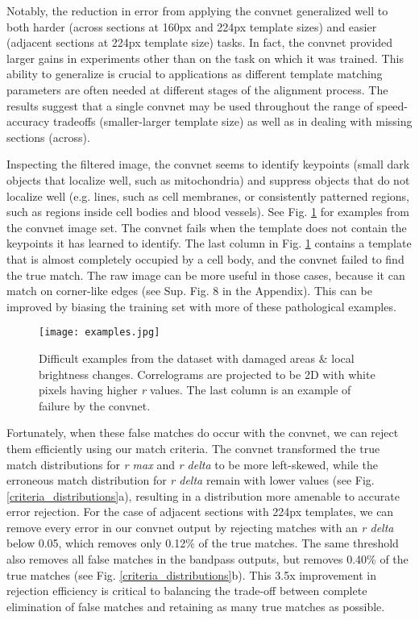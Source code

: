 \documentclass{article}
\begin{document}
Notably, the reduction in error from applying the convnet generalized well to both harder (across sections at 160px and 224px template sizes) and easier (adjacent sections at 224px template size) tasks. In fact, the convnet provided larger gains in experiments other than on the task on which it was trained. This ability to generalize is crucial to applications as different template matching parameters are often needed at different stages of the alignment process. The results suggest that a single convnet may be used throughout the range of speed-accuracy tradeoffs (smaller-larger template size) as well as in dealing with missing sections (across).

Inspecting the filtered image, the convnet seems to identify keypoints (small dark objects that localize well, such as mitochondria) and suppress objects that do not localize well (e.g. lines, such as cell membranes, or consistently patterned regions, such as regions inside cell bodies and blood vessels). See Fig. \ref{ncc_examples2} for examples from the convnet image set. The convnet fails when the template does not contain the keypoints it has learned to identify. The last column in Fig. \ref{ncc_examples2} contains a template that is almost completely occupied by a cell body, and the convnet failed to find the true match. The raw image can be more useful in those cases, because it can match on corner-like edges (see Sup. Fig. 8 in the Appendix). This can be improved by biasing the training set with more of these pathological examples.

\begin{figure}[h]
  \centering
  
  \texttt{[image: examples.jpg]}
  \caption{Difficult examples from the dataset with damaged areas \& local brightness changes. Correlograms are projected to be 2D with white pixels having higher \textit{r} values. The last column is an example of failure by the convnet.}
  \label{ncc_examples2}
\end{figure}

Fortunately, when these false matches do occur with the convnet, we can reject them efficiently using our match criteria. The convnet transformed the true match distributions for \textit{r max} and \textit{r delta} to be more left-skewed, while the erroneous match distribution for \textit{r delta} remain with lower values (see Fig. \ref{criteria_distributions}a), resulting in a distribution more amenable to accurate error rejection. For the case of adjacent sections with 224px templates, we can remove every error in our convnet output by rejecting matches with an \textit{r delta} below 0.05, which removes only 0.12\% of the true matches. The same threshold also removes all false matches in the bandpass outputs, but removes 0.40\% of the true matches (see Fig. \ref{criteria_distributions}b). This 3.5x improvement in rejection efficiency is critical to balancing the trade-off between complete elimination of false matches and retaining as many true matches as possible.
\end{document}
